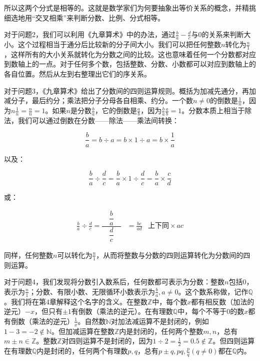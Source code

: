 \documentclass[b5paper]{ctexart}
\begin{document}
所以这两个分式是相等的。这就是数学家们为何要抽象出等价关系的概念，并精挑细选地用“交叉相乘”来判断分数、比例、分式相等。

\vspace{3mm}
对于问题2，我们可以利用《九章算术》中的办法，通过$\frac{b}{a} - \frac{d}{c}$与0的关系来判断大小。这个过程相当于通分后比较新的分子间大小。我们可以把任何整数$n$转化为$\frac{n}{1}$，这样所有的大小关系就转化为分数之间的比较。这也意味着任何一个分数都对应到数轴上的一点。对于任何多个数，包括整数、分数、小数都可以对应到数轴上的各自位置。然后从左到右整理出它们的序关系。

\vspace{3mm}
对于问题3，《九章算术》给出了分数间的四则运算规则。概括为加减先通分，再加减分子，最后约分；乘法把分子分母各自相乘、约分。一个数$n \ne 0$的倒数是$\frac{1}{n}$，因为$n\frac{1}{n} = \frac{n}{n} = 1$。如果$n$是分数$\frac{b}{a}$，它的倒数是$\frac{a}{b}$，因为$\frac{b}{a}\frac{a}{b} = 1$。分数本质上相当于除法，我们可以通过倒数在分数——除法——乘法间转换：

\[
\frac{b}{a} = b \div a = b \times 1 \div a = b \times \frac{1}{a}
\]

以及：

\[
\frac{b}{a} \div \frac{d}{c} = \frac{b}{a} \times 1 \div \frac{d}{c} = \frac{b}{a} \times \frac{c}{d}
\]

或：

\begin{align*}
\frac{b}{a} \div \frac{d}{c} = \dfrac{\quad\dfrac{b}{a}\quad}{\dfrac{d}{c}} &= \frac{bc}{ad} & \text{上下同} \times ac
\end{align*}

同样，任何整数$n$可以转化为$\frac{n}{1}$，从而将整数与分数的四则运算转化为分数间的四则运算。

\vspace{3mm}
对于问题4，我们发现将分数引入数系后，任何数都可表示为分数：整数$n$包括0，表示为$\frac{n}{1}$；分数、有限小数、无限循环小数表示为$\frac{b}{a}, a \ne 0$。这个数系称做，记作$\mathbb{Q}$。我们将在第4章解释这个名字的含义。在整数$\mathbb{Z}$中，每个数$x$都有相反数（加法的逆元）$-x$，但只有$\pm 1$有倒数（乘法的逆元）。在有理数$\mathbb{Q}$中，每个不等于0的数$x$都有倒数（乘法的逆元）$\frac{1}{x}$。自然数$\mathbb{N}$对加法减运算不是封闭的，例如$1 - 3 = -2 \notin \mathbb{N}$。但加减运算在整数$\mathbb{Z}$内是封闭的，任何两个整数$m, n$，总有$m \pm n \in \mathbb{Z}$。整数$\mathbb{Z}$对四则运算不是封闭的，因为$1 \div 2 = \frac{1}{2} = 0.5 \notin \mathbb{Z}$。但四则运算在有理数$\mathbb{Q}$内是封闭的，任何两个有理数$p, q$，总有$p \pm q, pq, \frac{p}{q} (q \ne 0)$都在$\mathbb{Q}$内。
\end{document}
